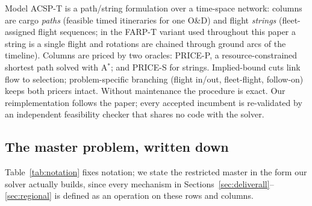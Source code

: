 \documentclass[11pt]{article}
\newcommand{\acsp}{ACSP}
\begin{document}
Model \acsp{}-T is a path/string formulation over a time-space network:
columns are cargo \emph{paths} (feasible timed itineraries for one O\&D) and
flight \emph{strings} (fleet-assigned flight sequences; in the FARP-T
variant used throughout this paper a string is a single flight and rotations
are chained through ground arcs of the timeline). Columns are priced by two
oracles: PRICE-P, a resource-constrained shortest path solved with
A${}^{*}$; and PRICE-S for strings. Implied-bound cuts link flow to
selection; problem-specific branching (flight in/out, fleet-flight,
follow-on) keeps both pricers intact. Without maintenance the procedure is
exact. Our reimplementation follows the paper; every accepted incumbent is
re-validated by an independent feasibility checker that shares no code with
the solver.

\subsection{The master problem, written down}\label{sec:model}

Table~\ref{tab:notation} fixes notation; we state the restricted master in
the form our solver actually builds, since every mechanism in
Sections~\ref{sec:deliverall}--\ref{sec:regional} is defined as an operation
on these rows and columns.
\end{document}

